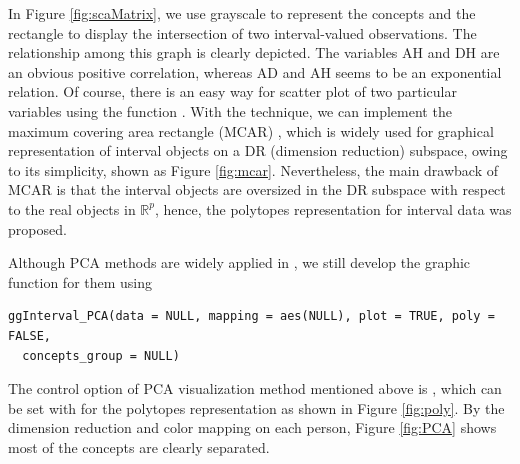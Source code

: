 \documentclass[article]{jss}
\begin{document}
In Figure \ref{fig:scaMatrix}, we use grayscale to represent the concepts and the rectangle to display the intersection of two interval-valued observations. The relationship among this graph is clearly depicted. The variables AH and DH are an obvious positive correlation, whereas AD and AH seems to be an exponential relation. Of course, there is an easy way for scatter plot of two particular variables using the function . With the technique, we can implement the maximum covering area rectangle (MCAR) \cite{cazes1997extension}, which is widely used for graphical representation of interval objects on a DR (dimension reduction) subspace, owing to its simplicity, shown as Figure \ref{fig:mcar}. Nevertheless, the main drawback of MCAR is that the interval objects are oversized in the DR subspace with respect to the real objects in $\mathbb{R}^p$, hence, the polytopes representation \cite{le2012symbolic} for interval data was proposed. 

Although PCA methods are widely applied in , we still develop the graphic function for them using 

\begin{verbatim}
ggInterval_PCA(data = NULL, mapping = aes(NULL), plot = TRUE, poly = FALSE, 
  concepts_group = NULL)
\end{verbatim}

The control option of PCA visualization method mentioned above is , which can be set with  for the polytopes representation as shown in Figure \ref{fig:poly}. By the dimension reduction and color mapping on each person, Figure \ref{fig:PCA} shows most of the concepts are clearly separated.
\end{document}
